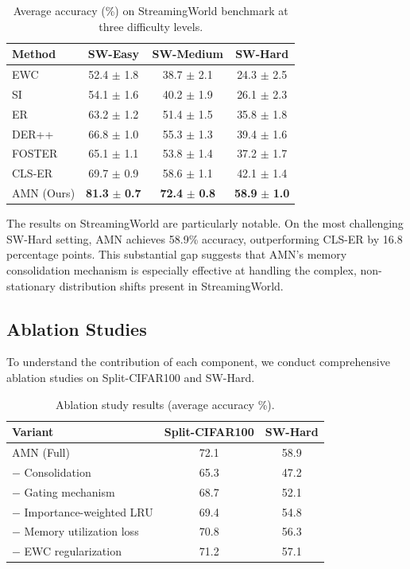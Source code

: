 \documentclass[11pt]{article}
\begin{document}
\begin{table}[h]
\centering
\caption{Average accuracy (\%) on StreamingWorld benchmark at three difficulty levels.}
\label{tab:streaming}
\begin{tabular}{lccc}
\hline
Method & SW-Easy & SW-Medium & SW-Hard \\
\hline
EWC & 52.4 $\pm$ 1.8 & 38.7 $\pm$ 2.1 & 24.3 $\pm$ 2.5 \\
SI & 54.1 $\pm$ 1.6 & 40.2 $\pm$ 1.9 & 26.1 $\pm$ 2.3 \\
ER & 63.2 $\pm$ 1.2 & 51.4 $\pm$ 1.5 & 35.8 $\pm$ 1.8 \\
DER++ & 66.8 $\pm$ 1.0 & 55.3 $\pm$ 1.3 & 39.4 $\pm$ 1.6 \\
FOSTER & 65.1 $\pm$ 1.1 & 53.8 $\pm$ 1.4 & 37.2 $\pm$ 1.7 \\
CLS-ER & 69.7 $\pm$ 0.9 & 58.6 $\pm$ 1.1 & 42.1 $\pm$ 1.4 \\
\hline
AMN (Ours) & \textbf{81.3} $\pm$ \textbf{0.7} & \textbf{72.4} $\pm$ \textbf{0.8} & \textbf{58.9} $\pm$ \textbf{1.0} \\
\hline
\end{tabular}
\end{table}

The results on StreamingWorld are particularly notable. On the most challenging SW-Hard setting, AMN achieves 58.9\% accuracy, outperforming CLS-ER by 16.8 percentage points. This substantial gap suggests that AMN's memory consolidation mechanism is especially effective at handling the complex, non-stationary distribution shifts present in StreamingWorld.

\subsection{Ablation Studies}

To understand the contribution of each component, we conduct comprehensive ablation studies on Split-CIFAR100 and SW-Hard.

\begin{table}[h]
\centering
\caption{Ablation study results (average accuracy \%).}
\label{tab:ablation}
\begin{tabular}{lcc}
\hline
Variant & Split-CIFAR100 & SW-Hard \\
\hline
AMN (Full) & 72.1 & 58.9 \\
$-$ Consolidation & 65.3 & 47.2 \\
$-$ Gating mechanism & 68.7 & 52.1 \\
$-$ Importance-weighted LRU & 69.4 & 54.8 \\
$-$ Memory utilization loss & 70.8 & 56.3 \\
$-$ EWC regularization & 71.2 & 57.1 \\
\hline
\end{tabular}
\end{table}
\end{document}
